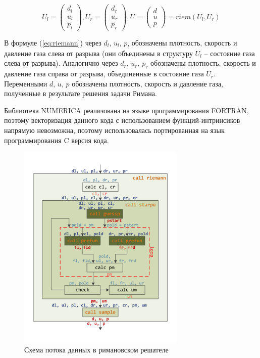 \documentclass[utf8]{psta}
\begin{document}
\begin{equation}\label{eq:riemann}
U_l = \left( \begin{array}{ccc} d_l \\ u_l \\ p_l \end{array} \right),
U_r = \left( \begin{array}{ccc} d_r \\ u_r \\ p_r \end{array} \right),
U = \left( \begin{array}{ccc} d \\ u \\ p \end{array} \right) = riem(U_l, U_r)
\end{equation}

В формуле (\ref{eq:riemann}) через $d_l$, $u_l$, $p_l$ обозначены плотность, скорость и давление газа слева от разрыва (они объединены в структуру  $U_l$ -- состояние газа слева от разрыва).
Аналогично через $d_r$, $u_r$, $p_r$ обозначены плотность, скорость и давление газа справа от разрыва, объединенные в состояние газа $U_r$.
Переменными $d$, $u$, $p$ обозначены плотность, скорость и давление газа, полученные в результате решения задачи Римана.

Библиотека NUMERICA реализована на языке программирования FORTRAN, поэтому векторизация данного кода с использованием функций-интринсиков напрямую невозможна, поэтому использовалась портированная на язык программирования C версия кода.

\begin{figure}
\includegraphics[width=8cm]{pics/pic_functions}
\caption{Схема потока данных в римановском решателе}
\label{pic:functions}
\end{figure}
\end{document}
